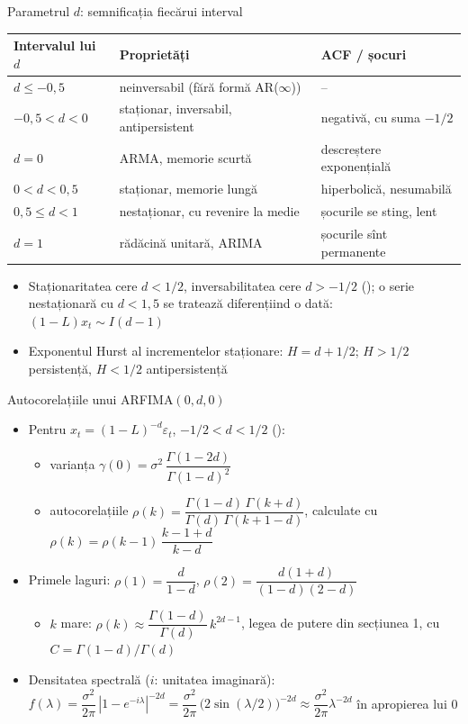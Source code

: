 \begin{frame}{Parametrul $d$: semnificația fiecărui interval}
\itemsize{\small}
\begin{center}
\footnotesize
\begin{tabular}{lll}
\toprule
\textbf{Intervalul lui $d$} & \textbf{Proprietăți} & \textbf{ACF / șocuri} \\
\midrule
$d \le -0{,}5$ & neinversabil (fără formă AR($\infty$)) & -- \\
$-0{,}5 < d < 0$ & staționar, inversabil, antipersistent & negativă, cu suma $-1/2$ \\
$d = 0$ & ARMA, memorie scurtă & descreștere exponențială \\
$0 < d < 0{,}5$ & staționar, memorie lungă & hiperbolică, nesumabilă \\
$0{,}5 \le d < 1$ & nestaționar, cu revenire la medie & șocurile se sting, lent \\
$d = 1$ & rădăcină unitară, ARIMA & șocurile sînt permanente \\
\bottomrule
\end{tabular}
\end{center}
\begin{itemize}
    \item Staționaritatea cere $d < 1/2$, inversabilitatea cere $d > -1/2$ (); o serie nestaționară cu $d < 1{,}5$ se tratează diferențiind o dată: $(1-L)x_t \sim I(d-1)$
    \item Exponentul Hurst al incrementelor staționare: $H = d + 1/2$; $H > 1/2$ persistență, $H < 1/2$ antipersistență
\end{itemize}
\end{frame}

\begin{frame}{Autocorelațiile unui ARFIMA$(0,d,0)$}
\itemsize{\small}
\begin{itemize}
    \item Pentru $x_t = (1-L)^{-d}\varepsilon_t$, $-1/2 < d < 1/2$ ():
    \begin{itemize}
        \item varianța $\gamma(0) = \sigma^2\,\dfrac{\Gamma(1-2d)}{\Gamma(1-d)^2}$
        \item autocorelațiile $\rho(k) = \dfrac{\Gamma(1-d)\,\Gamma(k+d)}{\Gamma(d)\,\Gamma(k+1-d)}$, calculate cu $\rho(k) = \rho(k-1)\,\dfrac{k-1+d}{k-d}$
    \end{itemize}
    \item Primele laguri: $\rho(1) = \dfrac{d}{1-d}$, \quad $\rho(2) = \dfrac{d(1+d)}{(1-d)(2-d)}$
    \begin{itemize}
        \item $k$ mare: $\rho(k) \approx \dfrac{\Gamma(1-d)}{\Gamma(d)}\,k^{2d-1}$, legea de putere din secțiunea 1, cu $C = \Gamma(1-d)/\Gamma(d)$
    \end{itemize}
    \item Densitatea spectrală ($i$: unitatea imaginară): $f(\lambda) = \dfrac{\sigma^2}{2\pi}\,|1 - e^{-i\lambda}|^{-2d} = \dfrac{\sigma^2}{2\pi}\,\bigl(2\sin(\lambda/2)\bigr)^{-2d} \approx \dfrac{\sigma^2}{2\pi}\lambda^{-2d}$ în apropierea lui 0
\end{itemize}
\end{frame}


